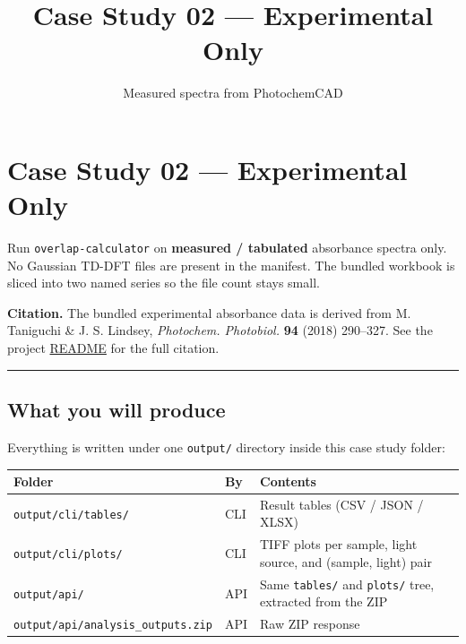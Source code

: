 \documentclass[
  11pt,
]{article}
\title{Case Study 02 — Experimental Only}
\subtitle{Measured spectra from PhotochemCAD}
\author{}
\date{}
\begin{document}
\maketitle

{
\hypersetup{linkcolor=}
\setcounter{tocdepth}{2}
\tableofcontents
}
\hypertarget{case-study-02--experimental-only}{
\section{Case Study 02 --- Experimental
Only}\label{case-study-02--experimental-only}}

Run \texttt{overlap-calculator} on \textbf{measured / tabulated}
absorbance spectra only. No Gaussian TD-DFT files are present in the
manifest. The bundled workbook is sliced into two named series so the
file count stays small.

\textbf{Citation.} The bundled experimental absorbance data is derived
from M. Taniguchi \& J. S. Lindsey, \emph{Photochem. Photobiol.}
\textbf{94} (2018) 290--327. See the project
\href{https://github.com/pinarsyt/overlap-calculator/blob/main/README.md\#acknowledgement-of-third-party-data}{README}
for the full citation.

\begin{center}\rule{0.5\linewidth}{0.5pt}\end{center}

\hypertarget{what-you-will-produce}{
\subsection{What you will produce}\label{what-you-will-produce}}

Everything is written under one \texttt{output/} directory inside this
case study folder:

\begin{longtable}[]{@{}lll@{}}
\toprule
Folder & By & Contents \\
\midrule
\endhead
\texttt{output/cli/tables/} & CLI & Result tables (CSV / JSON / XLSX) \\
\texttt{output/cli/plots/} & CLI & TIFF plots per sample, light source,
and (sample, light) pair \\
\texttt{output/api/} & API & Same \texttt{tables/} and \texttt{plots/}
tree, extracted from the ZIP \\
\texttt{output/api/analysis\_outputs.zip} & API & Raw ZIP response \\
\bottomrule
\end{longtable}
\end{document}

